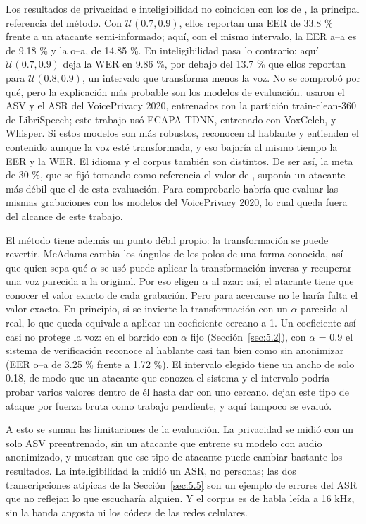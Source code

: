 \documentclass[10pt,twocolumn]{article}
\newcommand{\textcite}[1]{\citet{#1}}
\begin{document}
Los resultados de privacidad e inteligibilidad no coinciden con los de \textcite{patino2021}, la principal referencia del método. Con $\mathcal{U}(0.7, 0.9)$, ellos reportan una EER de 33.8 \% frente a un atacante semi-informado; aquí, con el mismo intervalo, la EER a--a es de 9.18 \% y la o--a, de 14.85 \%. En inteligibilidad pasa lo contrario: aquí $\mathcal{U}(0.7, 0.9)$ deja la WER en 9.86 \%, por debajo del 13.7 \% que ellos reportan para $\mathcal{U}(0.8, 0.9)$, un intervalo que transforma menos la voz. No se comprobó por qué, pero la explicación más probable son los modelos de evaluación. \textcite{patino2021} usaron el ASV y el ASR del VoicePrivacy 2020, entrenados con la partición train-clean-360 de LibriSpeech; este trabajo usó ECAPA-TDNN, entrenado con VoxCeleb, y Whisper. Si estos modelos son más robustos, reconocen al hablante y entienden el contenido aunque la voz esté transformada, y eso bajaría al mismo tiempo la EER y la WER. El idioma y el corpus también son distintos. De ser así, la meta de 30 \%, que se fijó tomando como referencia el valor de \textcite{patino2021}, suponía un atacante más débil que el de esta evaluación. Para comprobarlo habría que evaluar las mismas grabaciones con los modelos del VoicePrivacy 2020, lo cual queda fuera del alcance de este trabajo.

El método tiene además un punto débil propio: la transformación se puede revertir. McAdams cambia los ángulos de los polos de una forma conocida, así que quien sepa qué $\alpha$ se usó puede aplicar la transformación inversa y recuperar una voz parecida a la original. Por eso \textcite{patino2021} eligen $\alpha$ al azar: así, el atacante tiene que conocer el valor exacto de cada grabación. Pero para acercarse no le haría falta el valor exacto. En principio, si se invierte la transformación con un $\alpha$ parecido al real, lo que queda equivale a aplicar un coeficiente cercano a 1. Un coeficiente así casi no protege la voz: en el barrido con $\alpha$ fijo (Sección~\ref{sec:5.2}), con $\alpha$ = 0.9 el sistema de verificación reconoce al hablante casi tan bien como sin anonimizar (EER o--a de 3.25 \% frente a 1.72 \%). El intervalo elegido tiene un ancho de solo 0.18, de modo que un atacante que conozca el sistema y el intervalo podría probar varios valores dentro de él hasta dar con uno cercano. \textcite{patino2021} dejan este tipo de ataque por fuerza bruta como trabajo pendiente, y aquí tampoco se evaluó.

A esto se suman las limitaciones de la evaluación. La privacidad se midió con un solo ASV preentrenado, sin un atacante que entrene su modelo con audio anonimizado, y \textcite{patino2021} muestran que ese tipo de atacante puede cambiar bastante los resultados. La inteligibilidad la midió un ASR, no personas; las dos transcripciones atípicas de la Sección~\ref{sec:5.5} son un ejemplo de errores del ASR que no reflejan lo que escucharía alguien. Y el corpus es de habla leída a 16 kHz, sin la banda angosta ni los códecs de las redes celulares.
\end{document}
